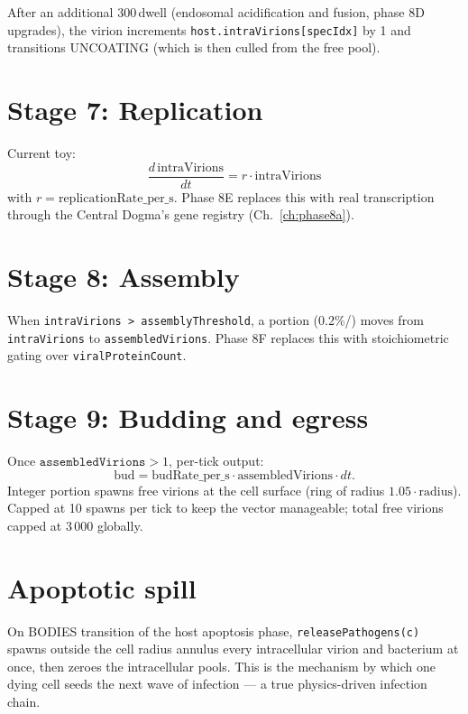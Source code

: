 \documentclass[11pt,letterpaper,twoside,openany]{book}
\newcommand{\code}[1]{\texttt{#1}}
\newcommand{\biosec}{\text{bio-s}}
\begin{document}
After an additional 300\,\biosec dwell (endosomal acidification and
fusion, phase 8D upgrades), the virion increments
\code{host.intraVirions[specIdx]} by 1 and transitions
UNCOATING (which is then culled from the free pool).

\section{Stage 7: Replication}

Current toy:
\begin{equation}
  \frac{d\,\text{intraVirions}}{dt} = r\cdot\text{intraVirions}
\end{equation}
with $r = \text{replicationRate\_per\_s}$. Phase 8E replaces this
with real transcription through the Central Dogma's gene registry
(Ch.~\ref{ch:phase8a}).

\section{Stage 8: Assembly}

When \code{intraVirions > assemblyThreshold}, a portion
(0.2\%/\biosec) moves from \code{intraVirions} to
\code{assembledVirions}. Phase 8F replaces this with stoichiometric
gating over \code{viralProteinCount}.

\section{Stage 9: Budding and egress}

Once $\code{assembledVirions} > 1$, per-tick output:
\begin{equation}
  \text{bud} = \text{budRate\_per\_s}\cdot\text{assembledVirions}\cdot dt.
\end{equation}
Integer portion spawns free virions at the cell surface (ring of
radius $1.05\cdot\text{radius}$). Capped at 10 spawns per tick to
keep the vector manageable; total free virions capped at 3\,000
globally.

\section{Apoptotic spill}

On BODIES transition of the host apoptosis phase,
\code{releasePathogens(c)} spawns outside the cell radius annulus
every intracellular virion and bacterium at once, then zeroes the
intracellular pools. This is the mechanism by which one dying cell
seeds the next wave of infection --- a true physics-driven
infection chain.
\end{document}
